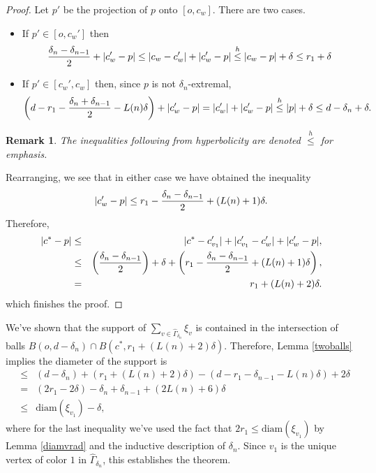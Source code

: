 \documentclass[11pt,letterpaper]{amsart}
\newtheorem*{remark}{Remark}
\begin{document}









\begin{proof}
Let $p'$ be the projection of $p$ onto $[o,c_w]$. There are two cases. 
\begin{itemize}
\item
If $p'\in[o,c_w']$ then 
$$
{\delta_n-\delta_{n-1}\over 2}+|c_w'-p|\leq |c_w-c'_w|+|c_w'-p|\stackrel{h}\leq |c_w-p|+\delta\leq r_1+\delta
$$

\item
If $p'\in[c_w',c_w]$ then, since $p$ is not $\delta_n$-extremal, 
$$
\left(d-r_1-{\delta_n+\delta_{n-1}\over 2}-L(n)\delta\right)+|c_w'-p|=|c'_w|+|c_w'-p|\stackrel{h}\leq|p|+\delta\leq d-\delta_n+\delta.
$$
\end{itemize}
\begin{remark}
The inequalities following from hyperbolicity are denoted $\stackrel{h}\leq$ for emphasis. 
\end{remark}
Rearranging, we see that in either case we have obtained the inequality 
$$
|c_w'-p|\leq r_1
-{\delta_{n}-\delta_{n-1}\over 2}
+(L(n)+1)\delta.
$$ 
Therefore, 
\begin{eqnarray*}
|c^*-p|&\leq&|c^*-c'_{v_1}|+|c'_{v_1}-c'_{w}|+|c'_w-p|,\\
&\leq&\left({\delta_n-\delta_{n-1}\over 2}\right)+\delta+\left(r_1-{\delta_n-\delta_{n-1}\over 2}+(L(n)+1)\delta\right),\\
&=&r_1+(L(n)+2)\delta. 
\end{eqnarray*}
which finishes the proof. 
\end{proof}

 We've shown that the support of $\sum_{v\in\hat\Gamma_{\delta_n}}\xi_v$ is contained in the intersection of balls $B(o,d-\delta_n)\cap B(c^*,r_1+(L(n)+2)\delta)$. Therefore, Lemma \ref{twoballs} implies the diameter of the support is 
\begin{eqnarray*}
&\leq&(d-\delta_n)+(r_1+(L(n)+2)\delta)-(d-r_1-\delta_{n-1}-L(n)\delta)+2\delta\\
&=&(2r_1-2\delta)-\delta_n+\delta_{n-1}+(2L(n)+6)\delta\\
&\leq&\mathrm{diam}(\xi_{v_1})-\delta,
\end{eqnarray*}
where for the last inequality we've used the fact that $2r_1\leq\mathrm{diam}(\xi_{v_1})$ by Lemma \ref{diamvrad} and the inductive description of $\delta_n$. Since $v_1$ is the unique vertex of color $1$ in $\hat\Gamma_{\delta_n}$, this establishes the theorem. 
\end{document}
